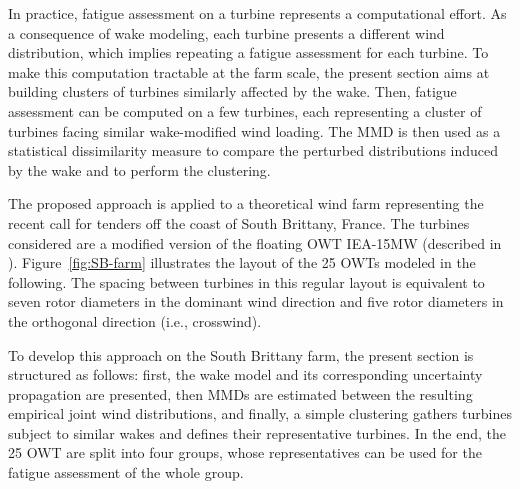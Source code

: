 In practice, fatigue assessment on a turbine represents a computational effort. 
As a consequence of wake modeling, each turbine presents a different wind distribution, which implies repeating a fatigue assessment for each turbine. 
To make this computation tractable at the farm scale, the present section aims at building clusters of turbines similarly affected by the wake. 
Then, fatigue assessment can be computed on a few turbines, each representing a cluster of turbines facing similar wake-modified wind loading. 
The MMD is then used as a statistical dissimilarity measure to compare the perturbed distributions induced by the wake and to perform the clustering. 

The proposed approach is applied to a theoretical wind farm representing the recent call for tenders off the coast of South Brittany, France. 
The turbines considered are a modified version of the floating OWT IEA-15MW (described in \citealp{kim_natarajan_2022}). 
Figure~\ref{fig:SB-farm} illustrates the layout of the 25 OWTs modeled in the following. %
The spacing between turbines in this regular layout is equivalent to seven rotor diameters in the dominant wind direction and five rotor diameters in the orthogonal direction (i.e., crosswind). 

To develop this approach on the South Brittany farm, the present section is structured as follows: 
first, the wake model and its corresponding uncertainty propagation are presented, 
then MMDs are estimated between the resulting empirical joint wind distributions, 
and finally, a simple clustering gathers turbines subject to similar wakes and defines their representative turbines. 
In the end, the 25 OWT are split into four groups, whose representatives can be used for the fatigue assessment of the whole group. 

